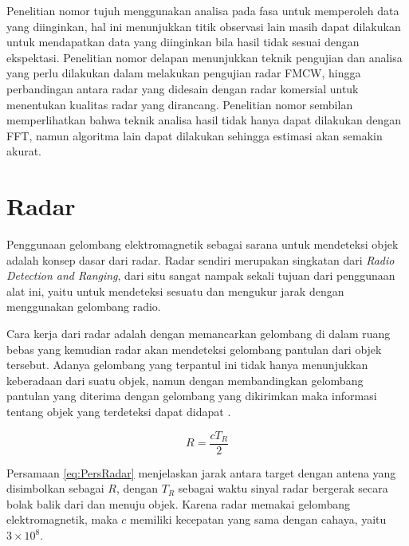 Penelitian nomor tujuh menggunakan analisa pada fasa untuk memperoleh data yang diinginkan, hal ini menunjukkan titik observasi lain masih dapat dilakukan untuk mendapatkan data yang diinginkan bila hasil tidak sesuai dengan ekspektasi. Penelitian nomor delapan menunjukkan teknik pengujian dan analisa yang perlu dilakukan dalam melakukan pengujian radar FMCW, hingga perbandingan antara radar yang didesain dengan radar komersial untuk menentukan kualitas radar yang dirancang. Penelitian nomor sembilan memperlihatkan bahwa teknik analisa hasil tidak hanya dapat dilakukan dengan FFT, namun algoritma lain dapat dilakukan sehingga estimasi akan semakin akurat.


\section{Radar}

Penggunaan gelombang elektromagnetik sebagai sarana untuk mendeteksi objek adalah konsep dasar dari radar. Radar sendiri merupakan singkatan dari \textit{Radio Detection and Ranging}, dari situ sangat nampak sekali tujuan dari penggunaan alat ini, yaitu untuk mendeteksi sesuatu dan mengukur jarak dengan menggunakan gelombang radio. 

Cara kerja dari radar adalah dengan memancarkan gelombang di dalam ruang bebas yang kemudian radar akan mendeteksi gelombang pantulan dari objek tersebut. Adanya gelombang yang terpantul ini tidak hanya menunjukkan keberadaan dari suatu objek, namun dengan membandingkan gelombang pantulan yang diterima dengan gelombang yang dikirimkan maka informasi tentang objek yang terdeteksi dapat didapat \cite{Skolnik2001}.

\begin{equation}
	R = \frac{cT_{R}}{2}
	\label{eq:PersRadar}
\end{equation}

Persamaan \ref{eq:PersRadar} menjelaskan jarak antara target dengan antena yang disimbolkan sebagai $R$, dengan $T_{R}$ sebagai waktu sinyal radar bergerak secara bolak balik dari dan menuju objek. Karena radar memakai gelombang elektromagnetik, maka $c$ memiliki kecepatan yang sama dengan cahaya, yaitu $3 \times 10 ^{8}$.

